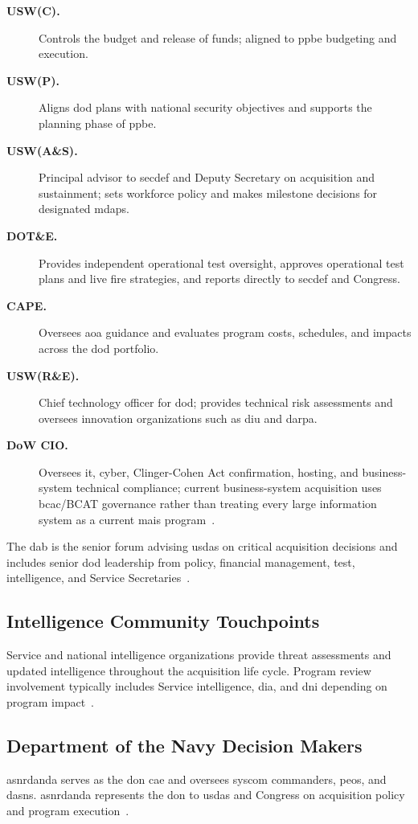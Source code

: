 \documentclass[../main.tex]{subfiles}
\begin{document}
\begin{description}
  \item[\textbf{USW(C).}] Controls the budget and release of funds; aligned to \ac{ppbe} budgeting and execution.
  \item[\textbf{USW(P).}] Aligns \ac{dod} plans with national security objectives and supports the planning phase of \ac{ppbe}.
  \item[\textbf{USW(A\&S).}] Principal advisor to \ac{secdef} and Deputy Secretary on acquisition and sustainment; sets workforce policy and makes milestone decisions for designated \acp{mdap}.
  \item[\textbf{DOT\&E.}] Provides independent operational test oversight, approves operational test plans and live fire strategies, and reports directly to \ac{secdef} and Congress.
  \item[\textbf{CAPE.}] Oversees \ac{aoa} guidance and evaluates program costs, schedules, and impacts across the \ac{dod} portfolio.
  \item[\textbf{USW(R\&E).}] Chief technology officer for \ac{dod}; provides technical risk assessments and oversees innovation organizations such as \ac{diu} and \ac{darpa}.
  \item[\textbf{DoW CIO.}] Oversees \ac{it}, cyber, Clinger-Cohen Act confirmation, hosting, and business-system technical compliance; current business-system acquisition uses \ac{bcac}/BCAT governance rather than treating every large information system as a current \ac{mais} program~\autocite{DoDI5000-75}.
\end{description}
The \ac{dab} is the senior forum advising \ac{usdas} on critical acquisition decisions and includes senior \ac{dod} leadership from policy, financial management, test, intelligence, and Service Secretaries~\autocite{edo-3-3-1-acq-policy-players-2025}.

\subsection{Intelligence Community Touchpoints}
Service and national intelligence organizations provide threat assessments and updated intelligence throughout the acquisition life cycle. Program review involvement typically includes Service intelligence, \ac{dia}, and \ac{dni} depending on program impact~\autocite{edo-3-3-1-acq-policy-players-2025}.

\subsection{Department of the Navy Decision Makers}
\ac{asnrdanda} serves as the \ac{don} \ac{cae} and oversees \ac{syscom} commanders, \acp{peo}, and \acp{dasn}. \ac{asnrdanda} represents the \ac{don} to \ac{usdas} and Congress on acquisition policy and program execution~\autocite{edo-3-3-1-acq-policy-players-2025}.
\end{document}
